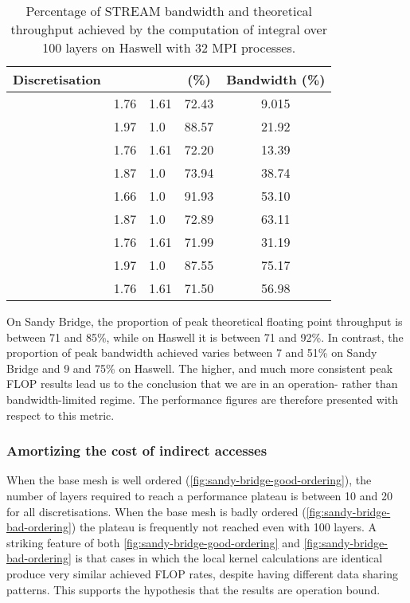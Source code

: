\documentclass[11pt, a4paper]{scrartcl}
\begin{document}
\begin{table}[htbp]
  \centering
  \begin{tabular}{l|l|l|c|c}
    Discretisation                      &  &  &  (\%) & Bandwidth (\%) \\
    \hline
     & 1.76    & 1.61    & 72.43        & 9.015          \\
     & 1.97    & 1.0     & 88.57        & 21.92          \\
     & 1.76    & 1.61    & 72.20        & 13.39          \\
     & 1.87    & 1.0     & 73.94        & 38.74          \\
     & 1.66    & 1.0     & 91.93        & 53.10          \\
     & 1.87    & 1.0     & 72.89        & 63.11          \\
     & 1.76    & 1.61    & 71.99        & 31.19          \\
     & 1.97    & 1.0     & 87.55        & 75.17          \\
     & 1.76    & 1.61    & 71.50        & 56.98          \\
  \end{tabular}
  \caption{Percentage of STREAM bandwidth and theoretical throughput
    achieved by the computation of integral  over 100 layers on
    Haswell with 32 MPI processes.\label{tab:haswell-percentage-peak}}
\end{table}

On Sandy Bridge, the proportion of peak theoretical floating point
throughput is between 71 and 85\%, while on Haswell it is between 71
and 92\%.  In contrast, the proportion of peak bandwidth achieved
varies between 7 and 51\% on Sandy Bridge and 9 and 75\% on Haswell.
The higher, and much more consistent peak FLOP results lead us to the
conclusion that we are in an operation- rather than bandwidth-limited
regime.  The performance figures are therefore presented with respect
to this metric.

\subsubsection{Amortizing the cost of indirect accesses}
\label{sssec:amortizing-indirect}

When the base mesh is well ordered
(\autoref{fig:sandy-bridge-good-ordering}), the number of layers
required to reach a performance plateau is between 10 and 20 for all
discretisations. When the base mesh is badly ordered
(\autoref{fig:sandy-bridge-bad-ordering}) the plateau is frequently
not reached even with 100 layers.  A striking feature of both
\autoref{fig:sandy-bridge-good-ordering} and
\autoref{fig:sandy-bridge-bad-ordering} is that cases in which the
local kernel calculations are identical produce very similar achieved
FLOP rates, despite having different data sharing patterns.  This
supports the hypothesis that the results are operation bound.
\end{document}
